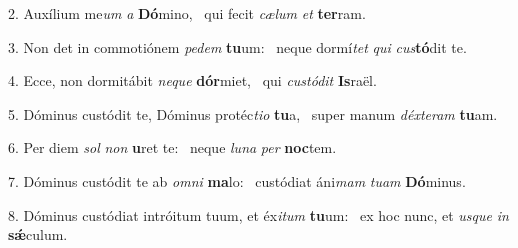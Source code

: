 2. Auxílium me\textit{um} \textit{a} \textbf{Dó}mino, \ast\  qui fecit \textit{cæ}\textit{lum} \textit{et} \textbf{ter}ram.\

3. Non det in commotiónem \textit{pe}\textit{dem} \textbf{tu}um: \ast\  neque dormí\textit{tet} \textit{qui} \textit{cus}\textbf{tó}dit te.\

4. Ecce, non dormitábit \textit{ne}\textit{que} \textbf{dór}miet, \ast\  qui \textit{cus}\textit{tó}\textit{dit} \textbf{Is}raël.\

5. Dóminus custódit te, Dóminus protéc\textit{ti}\textit{o} \textbf{tu}a, \ast\  super manum \textit{déx}\textit{te}\textit{ram} \textbf{tu}am.\

6. Per diem \textit{sol} \textit{non} \textbf{u}ret te: \ast\  neque \textit{lu}\textit{na} \textit{per} \textbf{noc}tem.\

7. Dóminus custódit te ab \textit{om}\textit{ni} \textbf{ma}lo: \ast\  custódiat áni\textit{mam} \textit{tu}\textit{am} \textbf{Dó}minus.\

8. Dóminus custódiat intróitum tuum, et éx\textit{i}\textit{tum} \textbf{tu}um: \ast\  ex hoc nunc, et \textit{us}\textit{que} \textit{in} \textbf{sǽ}culum.\

